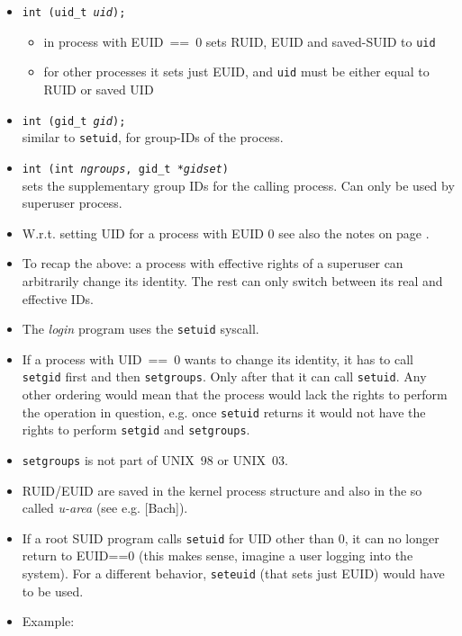 \begin{slide}
\begin{itemize}
\item \texttt{int (uid\_t \emph{uid});}
    \begin{itemize}
    \item in process with EUID~==~0 sets RUID, EUID and saved-SUID to
    \texttt{uid}
    \item for other processes it sets just EUID, and \texttt{uid} must be
    either equal to RUID or saved UID
    \end{itemize}
\item \texttt{int (gid\_t \emph{gid});} \\
similar to \texttt{setuid}, for group-IDs of the process.
\item \texttt{int (int \emph{ngroups},
gid\_t *\emph{gidset})} \\
sets the supplementary group IDs for the calling process. Can only be used
by superuser process.
\end{itemize}
\end{slide}

\begin{itemize}
\item W.r.t. setting UID for a process with EUID 0 see also the notes on page
\pageref{ROOT_SETUID}.
\item To recap the above: a process with effective rights of a superuser can
arbitrarily change its identity. The rest can only switch between its real and
effective IDs.
\item The \emph{login} program uses the \texttt{setuid} syscall.
\item If a process with UID~==~0 wants to change its identity, it has to call
\texttt{setgid} first and then \texttt{setgroups}. Only after that it can call
\texttt{setuid}. Any other ordering would mean that the process would lack the
rights to perform the operation in question, e.g. once \texttt{setuid} returns
it would not have the rights to perform \texttt{setgid} and \texttt{setgroups}.
\item \texttt{setgroups} is not part of UNIX~98 or UNIX~03.
\item RUID/EUID are saved in the kernel process structure and also in the so
called \emph{u-area} (see e.g. [Bach]).
\item If a root SUID program calls \texttt{setuid} for UID other than 0, it can
no longer return to EUID==0 (this makes sense, imagine a user logging into the
system). For a different behavior, \texttt{seteuid} (that sets just EUID) would
have to be used.
\item Example: 
\end{itemize}

